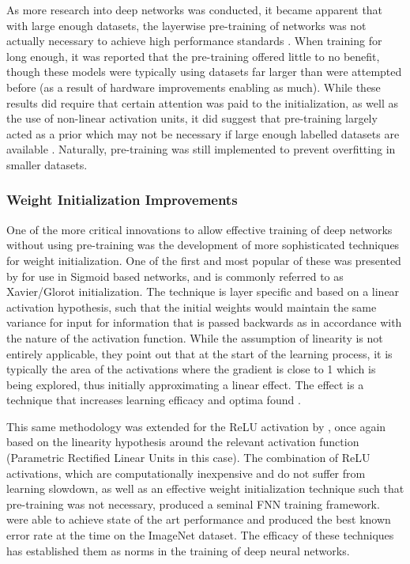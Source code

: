 \documentclass[a4paper,11pt,oneside]{article}
\theoremstyle{plain}
\theoremstyle{definition}
\begin{document}
	As more research into deep networks was conducted, it became apparent that with large enough datasets, the
	layerwise pre-training of networks was not actually necessary to achieve high performance standards 
	\citep{ImageNet, Glorot2, Ciresan}. When training for long enough, it was reported that the pre-training offered little to no 
	benefit, though these models were typically using datasets far larger than were attempted before (as a result of
	hardware improvements enabling as much). While these results did require that certain attention was paid to the 
	initialization, as well as the use of non-linear activation units, it did suggest that pre-training largely acted as a prior 
	which may not be necessary if large enough labelled datasets are available \citep{Bengio3}. Naturally, pre-training was still 
	implemented to prevent overfitting in smaller datasets.
	\hfill \break 
	
	\subsubsection{Weight Initialization Improvements}\label{lr_weight_init}
	
	One of the more critical innovations to allow effective training of deep networks without using pre-training was the development of more sophisticated techniques for weight initialization. One of the first and most popular of these was presented by \citet{Glorot} for use in Sigmoid based networks, 
	and is commonly referred to as Xavier/Glorot initialization. The technique is layer specific and based on a linear activation
	hypothesis, such that the initial weights would maintain the same variance for input for information that is passed backwards as in 
	accordance with the nature of the activation function. While the assumption of linearity is not entirely applicable, they point out that at the 
	start of the learning process, it is typically the area of the activations where the gradient is close to 1 which is being explored, thus initially approximating 
	a linear effect. The effect is a technique that increases learning efficacy and optima found \citep{Glorot}. \newline
	
	This same methodology was extended for the ReLU activation by \citet{He}, once again based on the linearity hypothesis around the 
	relevant activation function (Parametric Rectified Linear Units in this case). The combination of ReLU activations, which are computationally inexpensive and do not suffer from learning slowdown, as well as an effective weight initialization technique such that pre-training was not necessary, produced a seminal FNN training framework. \citet{He} were able to 
	achieve state of the art performance and produced the best known error rate at the time on the ImageNet dataset. The efficacy of these techniques has established 
	them as norms in the training of deep neural networks.
	
\end{document}
